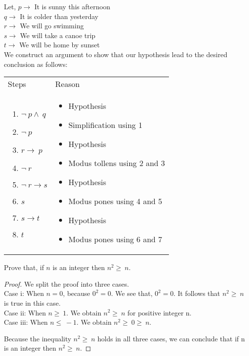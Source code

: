 \documentclass[../main-sheet.tex]{subfiles}
\begin{document}
\begin{soln}
    Let,\newline
    \(p\to\) It is sunny this afternoon\\
    \(q\to\) It is colder than yesterday\\
    \(r\to\) We will go swimming\\
    \(s\to\) We will take a canoe trip\\
    \(t\to\) We will be home by sunset\\
    We construct an argument to show that our hypothesis lead to the desired conclusion as follows:\\
    \begin{tabular}{p{} p{}}
        \qquad Steps & \qquad Reason              \\
        {
        \begin{enumerate}
            \item \(\neg\ p\wedge\ q\)
            \item \(\neg\ p\)
            \item \(r\to\ p\)
            \item \(\neg\ r\)
            \item \(\neg\ r\to s\)
            \item \(s\)
            \item \(s\to t\)
            \item \(t\)
        \end{enumerate}
        }            & \begin{itemize}
            \item [] Hypothesis
            \item [] Simplification using 1
            \item [] Hypothesis
            \item [] Modus tollens using 2 and 3
            \item [] Hypothesis
            \item [] Modus pones using 4 and 5
            \item [] Hypothesis
            \item [] Modus pones using 6 and 7
        \end{itemize} 
    \end{tabular}
\end{soln}
\begin{prob}
    Prove that, if $ n $ is an integer then \(n^2\geq\ n\).
\end{prob}
\begin{proof}
    We split the proof into three cases.\\
    Case i: When \(n=0\), because \(0^2=0\). We see that, \(0^2=0\).
    It follows that \(n^2\geq\ n\) is true in this case.\\
    Case ii: When \(n\geq\ 1\). We obtain \(n^2\geq\ n\) for positive integer n.\\
    Case iii: When \(n\leq\ -1\). We obtain \(n^2\geq\ 0\geq\ n\).

    Because the inequality \(n^2\geq\ n\) holds in all three cases, we can conclude that if n is an integer then \(n^2\geq\ n\).
\end{proof}
\end{document}

